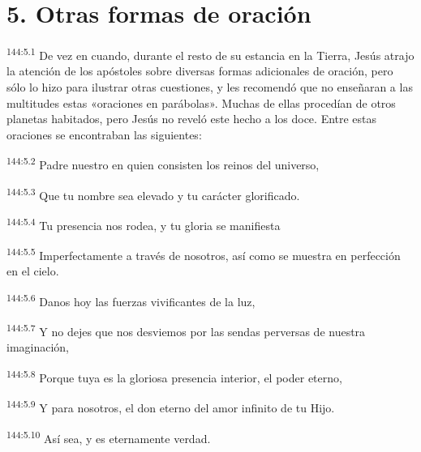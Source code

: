 \section*{5. Otras formas de oración}
\par 
\textsuperscript{144:5.1} De vez en cuando, durante el resto de su estancia en la Tierra, Jesús atrajo la atención de los apóstoles sobre diversas formas adicionales de oración, pero sólo lo hizo para ilustrar otras cuestiones, y les recomendó que no enseñaran a las multitudes estas «oraciones en parábolas». Muchas de ellas procedían de otros planetas habitados, pero Jesús no reveló este hecho a los doce. Entre estas oraciones se encontraban las siguientes:
\begin{center}
\par 
\textsuperscript{144:5.2} Padre nuestro en quien consisten los reinos del universo,

\par 
\textsuperscript{144:5.3} Que tu nombre sea elevado y tu carácter glorificado.

\par 
\textsuperscript{144:5.4} Tu presencia nos rodea, y tu gloria se manifiesta

\par 
\textsuperscript{144:5.5} Imperfectamente a través de nosotros, así como se muestra en perfección en el cielo.

\par 
\textsuperscript{144:5.6} Danos hoy las fuerzas vivificantes de la luz,

\par 
\textsuperscript{144:5.7} Y no dejes que nos desviemos por las sendas perversas de nuestra imaginación,

\par 
\textsuperscript{144:5.8} Porque tuya es la gloriosa presencia interior, el poder eterno,

\par 
\textsuperscript{144:5.9} Y para nosotros, el don eterno del amor infinito de tu Hijo.

\par 
\textsuperscript{144:5.10} Así sea, y es eternamente verdad.
\end{center}

